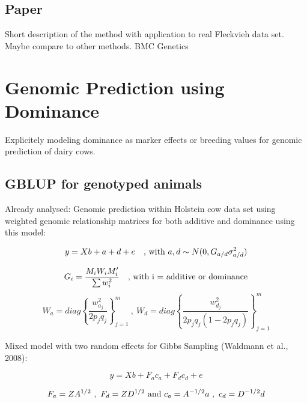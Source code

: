 \documentclass[a4paper,DIVcalc,12pt,liststotoc,bibtotoc,headsepline,plainheadsepline]{scrartcl}
\begin{document}
\subsection{Paper}

Short description of the method with application to real Fleckvieh data set. Maybe compare to other methods.
BMC Genetics

\clearpage
\thispagestyle{sectionstyle}

\section{Genomic Prediction using Dominance}

Explicitely modeling dominance as marker effects or breeding values for genomic prediction of dairy cows.

\subsection{GBLUP for genotyped animals}
Already analysed: Genomic prediction within Holstein cow data set using weighted genomic relationship matrices for both additive and dominance using this model:

\begin{equation*}
y = Xb + a + d + e ~~~ \textnormal{, with $a,d$} \sim N(0,G_{a/d} \sigma^{2}_{a/d}) 
\end{equation*}



\begin{equation*}
G_i = \frac{M_i W_i M_{i}'}{\sum w_{i}^2}  ~~~ \textnormal{, with i = additive or dominance}
\end{equation*}
\begin{equation*}
W_a = diag\left\{\frac{w_{a_j}^2}{2 p_j q_j}\right\}_{j=1}^{m} ~,~ W_d = diag\left\{\frac{w_{d_j}^2}{2 p_j q_j (1 - 2 p_j q_j)}\right\}_{j=1}^{m} 
\end{equation*}


Mixed model with two random effects for Gibbs Sampling (Waldmann et al., 2008):

\begin{equation*}
y = Xb + F_a c_a + F_d c_d + e 
\end{equation*}

\begin{equation*}
F_a = ZA^{1/2} ~,~ F_d = ZD^{1/2} \textnormal{  and  } c_a = A^{-1/2}a ~,~ c_d = D^{-1/2}d 
\end{equation*}
\end{document}
